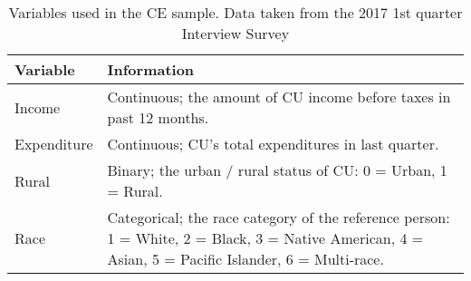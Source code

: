 \documentclass[11pt]{article}
\begin{document}
\begin{table}
\centering
\begin{tabular}{p{0.7in} p{5.5in}}
Variable &  Information \\ \hline
Income & Continuous; the amount of CU income before taxes in past 12 months. \\
Expenditure & Continuous; CU's total expenditures in last quarter. \\
Rural & Binary; the urban / rural status of CU: 0 = Urban, 1 = Rural. \\
Race & Categorical; the race category of the reference person: 1 = White, 2 = Black, 3 = Native American,
4 = Asian, 5 = Pacific Islander, 6 = Multi-race. \\ \hline
\end{tabular}
\caption{Variables used in the CE sample. Data taken
  from the 2017 1st quarter Interview Survey} 
\end{table}
\end{document}
